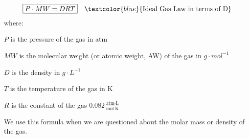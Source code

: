 \documentclass[main.tex]{subfiles}
\begin{document}
\begin{description}
\begin{equation*}\begin{split}
\boxed{  P\cdot MW=DRT} \quad \textcolor{blue}{\text{Ideal Gas Law in terms of D}}
\end{split}\end{equation*}
where:
\begin{where}
 \item $P$   is the pressure of the gas in atm
\item $MW$ is the molecular weight (or atomic weight, AW) of the gas in $g\cdot mol^{-1}$ 
 \item $D$   is the density in $g\cdot L^{-1}$
\item $T$   is the temperature of the gas in K
\item $R$   is the constant of the gas $0.082\frac{\text{atm}\cdot \text{L}}{\text{mol}\cdot \text{K}}$
\end{where}
We use this formula when we are questioned about the molar mass or density of the gas.


\end{description}
\end{document}
